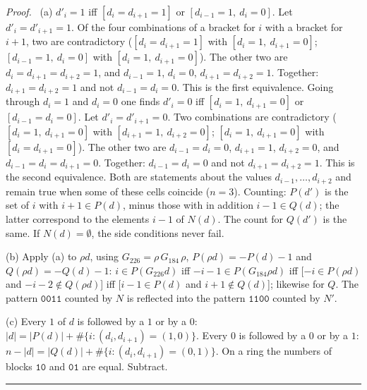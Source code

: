 \documentclass[10pt,a4paper]{article}
\newcommand{\qedmark}{\rule{1.1ex}{1.1ex}}
\newenvironment{proof}[1][Proof]{\par\smallskip\noindent\textit{#1.}\ }{\hfill\qedmark\par\smallskip}
\newcommand{\code}[1]{\mathtt{#1}}            %
\begin{document}
\begin{proof}
(a) $d'_i=1$ iff $[d_i=d_{i+1}=1]$ or $[d_{i-1}=1,\ d_i=0]$. Let $d'_i=d'_{i+1}=1$. Of the four combinations of
a bracket for $i$ with a bracket for $i+1$, two are contradictory ($[d_i=d_{i+1}=1]$ with $[d_i=1,\ d_{i+1}=0]$;
$[d_{i-1}=1,\ d_i=0]$ with $[d_i=1,\ d_{i+1}=0]$). The other two are $d_i=d_{i+1}=d_{i+2}=1$, and
$d_{i-1}=1$, $d_i=0$, $d_{i+1}=d_{i+2}=1$. Together: $d_{i+1}=d_{i+2}=1$ and not $d_{i-1}=d_i=0$. This is the
first equivalence. Going through $d_i=1$ and $d_i=0$ one finds $d'_i=0$ iff $[d_i=1,\ d_{i+1}=0]$ or
$[d_{i-1}=d_i=0]$. Let $d'_i=d'_{i+1}=0$. Two combinations are contradictory ($[d_i=1,\ d_{i+1}=0]$ with
$[d_{i+1}=1,\ d_{i+2}=0]$; $[d_i=1,\ d_{i+1}=0]$ with $[d_i=d_{i+1}=0]$). The other two are $d_{i-1}=d_i=0$,
$d_{i+1}=1$, $d_{i+2}=0$, and $d_{i-1}=d_i=d_{i+1}=0$. Together: $d_{i-1}=d_i=0$ and not $d_{i+1}=d_{i+2}=1$.
This is the second equivalence. Both are statements about the values $d_{i-1},\dots,d_{i+2}$ and remain true when
some of these cells coincide ($n=3$). Counting: $P(d')$ is the set of $i$ with $i+1\in P(d)$, minus those with in
addition $i-1\in Q(d)$; the latter correspond to the elements $i-1$ of $N(d)$. The count for $Q(d')$ is the same.
If $N(d)=\emptyset$, the side conditions never fail.

(b) Apply (a) to $\rho d$, using $G_{226}=\rho\,G_{184}\,\rho$, $P(\rho d)=-P(d)-1$ and $Q(\rho d)=-Q(d)-1$:
$i\in P(G_{226}d)$ iff $-i-1\in P(G_{184}\rho d)$ iff [$-i\in P(\rho d)$ and $-i-2\notin Q(\rho d)$] iff
[$i-1\in P(d)$ and $i+1\notin Q(d)$]; likewise for $Q$. The pattern $\code{0011}$ counted by $N$ is reflected
into the pattern $\code{1100}$ counted by $N'$.

(c) Every $1$ of $d$ is followed by a $1$ or by a $0$: $|d|=|P(d)|+\#\{i:(d_i,d_{i+1})=(1,0)\}$. Every $0$ is
followed by a $0$ or by a $1$: $n-|d|=|Q(d)|+\#\{i:(d_i,d_{i+1})=(0,1)\}$. On a ring the numbers of blocks
$\code{10}$ and $\code{01}$ are equal. Subtract.
\end{proof}
\end{document}

